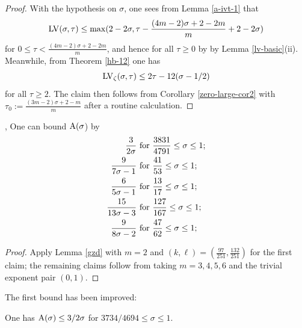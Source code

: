 \begin{proof} With the hypothesis on $\sigma$, one sees from Lemma \ref{a-ivt-1} that
$$ \mathrm{LV}(\sigma,\tau) \leq \max( 2 - 2 \sigma, \tau - \frac{(4m-2)\sigma + 2-2m}{m} + 2-2\sigma)$$
for $0 \leq \tau < \frac{(4m-2)\sigma + 2-2m}{m}$, and hence for all $\tau \geq 0$ by by Lemma \ref{lv-basic}(ii).  Meanwhile, from Theorem \ref{hb-12} one has
$$\mathrm{LV}_\zeta(\sigma,\tau) \leq 2\tau - 12 (\sigma-1/2)$$
for all $\tau \geq 2$.  The claim then follows from Corollary
\ref{zero-large-cor2} with $\tau_0 := \frac{(3m-2)\sigma+2-m}{m}$ after a routine calculation.
\end{proof}

\begin{corollary}\label{further_ivic_zero}\cite{ivic_exponent_pairs}, \cite[Theorem 11.4]{ivic} One can bound $\mathrm{A}(\sigma$) by
\begin{align*}
 \frac{3}{2\sigma} &\hbox{ for } \frac{3831}{4791} \leq \sigma \leq 1;\\
 \frac{9}{7\sigma-1} &\hbox{ for } \frac{41}{53} \leq \sigma \leq 1; \\
 \frac{6}{5\sigma-1} &\hbox{ for } \frac{13}{17} \leq \sigma \leq 1; \\
 \frac{15}{13\sigma-3} &\hbox{ for } \frac{127}{167} \leq \sigma \leq 1; \\
 \frac{9}{8\sigma-2} &\hbox{ for } \frac{47}{62} \leq \sigma \leq 1;
\end{align*}
\end{corollary}
\literature
{}
\derived
{}

\begin{proof} Apply Lemma \ref{gzd} with $m=2$ and $(k,\ell) = (\frac{97}{251}, \frac{132}{251})$ for the first claim; the remaining claims follow from taking $m=3, 4, 5, 6$ and the trivial exponent pair $(0, 1)$.
\end{proof}

The first bound has been improved:

\begin{theorem}\label{bourgain-zero-density-2000}\cite{bourgain_dirichlet_2000} One has $\mathrm{A}(\sigma) \leq 3/2\sigma$ for $3734/4694 \leq \sigma \leq 1$.
\end{theorem}
\literature
{}

